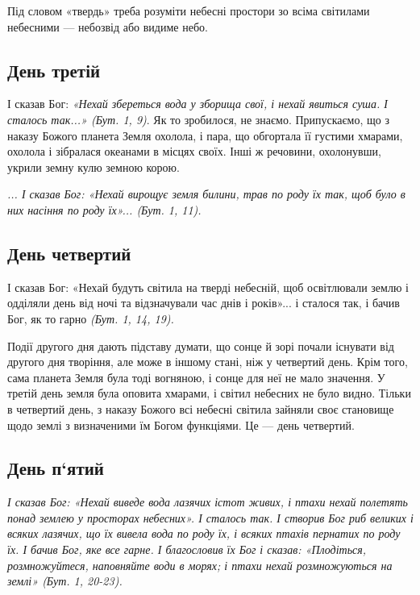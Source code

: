 \documentclass[main.tex]{subfiles}
\begin{document}
Під словом «твердь» треба розуміти небесні простори зо всіма світилами небесними — небозвід або видиме небо.

\subsection{День третій}

І сказав Бог: \emph{«{\color{red}Нехай збереться вода у зборища свої, і нехай явиться суша.} І сталось так...» (Бут. 1, 9)}. Як то зробилося, не знаємо. Припускаємо, що з наказу Божого планета Земля охолола, і пара, що обгортала її густими хмарами, охолола і зібралася океанами в місцях своїх. Інші ж речовини, охолонувши, укрили земну кулю земною корою.
\begin{FlushRight}
    \emph{... І сказав Бог: {\color{red} «Нехай вирощує земля билини, трав по роду їх так, щоб було в них насіння по роду їх»}... (Бут. 1, 11).}
\end{FlushRight}

\subsection{День четвертий}

І сказав Бог: «Нехай будуть світила на тверді небесній, щоб освітлювали землю і одділяли день від ночі та відзначували час днів і років»... і сталося так, і бачив Бог, як то гарно \emph{(Бут. 1, 14, 19).}

Події другого дня дають підставу думати, що сонце й зорі почали існувати від другого дня творіння, але може в іншому стані, ніж у четвертий день. Крім того, сама планета Земля була тоді вогняною, і сонце для неї не мало значення. У третій день земля була оповита хмарами, і світил небесних не було видно. Тільки в четвертий день, з наказу Божого всі небесні світила зайняли своє становище щодо землі з визначеними їм Богом функціями. Це — день четвертий.

\subsection{День п`ятий}
\begin{FlushRight}
    \emph{І сказав Бог: {\color{red} «Нехай виведе вода лазячих істот живих, і птахи нехай полетять понад землею у просторах небесних»}. І сталось так. І створив Бог риб великих і всяких лазячих, що їх вивела вода по роду їх, і всяких птахів пернатих по роду їх. І бачив Бог, яке все гарне. І благословив їх Бог і сказав: {\color{red} «Плодіться, розмножуйтеся, наповняйте води в морях; і птахи нехай розмножуються на землі»} (Бут. 1, 20-23). }
\end{FlushRight}
\end{document}
